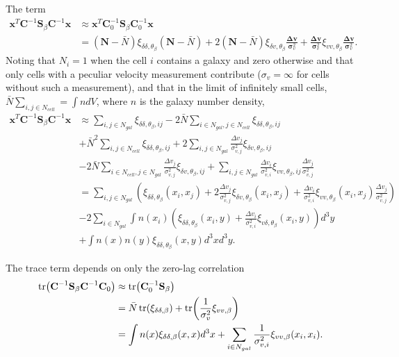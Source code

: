 \documentclass{article}
\begin{document}
The term
\begin{align}
\textbf{x}^T \textbf{C}^{-1} \textbf{S}_\beta \textbf{C}^{-1} \textbf{x} & \approx \textbf{x}^T \textbf{C}_0^{-1} \textbf{S}_\beta \textbf{C}_0^{-1} \textbf{x}\\
&=(\textbf{N}-\bar{N}) \xi_{\delta\delta,\theta_\beta}  (\textbf{N}-\bar{N})  + 2  (\textbf{N}-\bar{N}) \xi_{\delta v,\theta_\beta}\frac{\mathbf{\Delta v}}{\bm{\sigma}_v^2}+ 
\frac{\mathbf{\Delta v}}{\bm{\sigma}_v^2} \xi_{vv,\theta_\beta}\frac{\mathbf{\Delta v}}{\bm{\sigma}_v^2}.
\end{align}
Noting that $N_i=1$ when the cell $i$ contains a galaxy and zero otherwise and that only cells with a peculiar velocity measurement contribute ($\sigma_v =\infty$
for cells without such a measurement), and that in the limit of infinitely small cells, $\bar{N}\sum_{i,j\in N_{cell}} = \int n dV$, where $n$ is the galaxy number density,
\begin{align*}
\textbf{x}^T \textbf{C}^{-1} \textbf{S}_\beta \textbf{C}^{-1} \textbf{x} & \approx \sum_{i,j\in N_{gal}} \xi_{\delta\delta,\theta_\beta,ij} -2 \bar{N} \sum_{i\in N_{gal},j\in N_{cell}} \xi_{\delta\delta,\theta_\beta,ij}\\
& +\bar{N}^2  \sum_{i,j\in N_{cell}}  \xi_{\delta\delta,\theta_\beta,ij} + 2 \sum_{i,j\in N_{gal}} \frac{\Delta v_j}{\sigma_{v,j}^2} \xi_{\delta v,\theta_\beta,ij} \\
& -2\bar{N}\sum_{i\in N_{cell}, j\in N_{gal}} \frac{\Delta v_j}{\sigma_{v,j}^2} \xi_{\delta v,\theta_\beta,ij}  + \sum_{i,j\in N_{gal}} \frac{\Delta v_i}{\sigma_{v,i}^2} \xi_{vv,\theta_\beta,ij} \frac{\Delta v_j}{\sigma_{v,j}^2}\\
& = \sum_{i,j\in N_{gal}} \left( \xi_{\delta\delta,\theta_\beta}(x_i,x_j) + 2  \frac{\Delta v_j}{\sigma_{v,j}^2} \xi_{\delta v,\theta_\beta}(x_i,x_j) + \frac{\Delta v_i}{\sigma_{v,i}^2} \xi_{vv,\theta_\beta}(x_i,x_j) \frac{\Delta v_j}{\sigma_{v,j}^2}\right)\\
&-2  \sum_{i\in N_{gal}}\int n(x_i) \left(\xi_{\delta\delta,\theta_\beta}(x_i,y) + \frac{\Delta v_i}{\sigma_{v,i}^2} \xi_{v \delta,\theta_\beta}(x_i,y) \right) d^3y\\
&  + \int n(x) n(y) \xi_{\delta\delta,\theta_\beta}(x,y)d^3xd^3y.
\end{align*}

The trace term depends on only the zero-lag correlation
\begin{align}
 \tr(\textbf{C}^{-1} \textbf{S}_\beta \textbf{C}^{-1} \textbf{C}_0) & \approx  \tr(\textbf{C}_0^{-1} \textbf{S}_\beta) \\
 & = \bar{N} \tr(\xi_{\delta\delta,\beta}) + \tr(\frac{1}{\sigma^2_v} \xi_{vv,\beta})\\
 & = \int n(x) \xi_{\delta \delta,\beta}(x,x) d^3x +  \sum_{i\in N_{gal}} \frac{1}{\sigma^2_{v,i}} \xi_{vv,\beta}(x_i,x_i).
\end{align}
\end{document}
